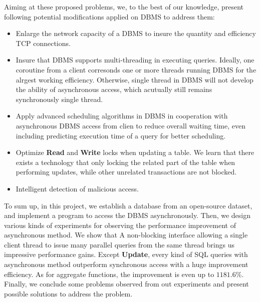 \documentclass[onecolumn, conference, 12pt]{IEEEtran}
\begin{document}
	Aiming at these proposed problems, we, to the best of our knowledge, present following potential modifications applied on DBMS to address them:
	\begin{itemize}
		\item Enlarge the network capacity of a DBMS to insure the quantity and efficiency TCP connections.
		\item Insure that DBMS supports multi-threading in executing queries. Ideally, one coroutine from a client corresonds one or more threads running DBMS for the alrgest working efficiency. Otherwise, single thread in DBMS will not develop the ability of asynchronous access, which acutually still remains synchronously single thread.
		\item Apply advanced scheduling algorithms in DBMS in cooperation with asynchronous DBMS access from clien to reduce overall waiting time, even including predicting execution time of a query for better scheduling.
		\item Optimize \textbf{Read} and \textbf{Write} locks when updating a table. We learn that there exists a technology that only locking the related part of the table when performing updates, while other unrelated transactions are not blocked.
		\item Intelligent detection of malicious access. 
	\end{itemize}
	
	To sum up, in this project, we establish a database from an open-source dataset, and implement a program to access the DBMS asynchronously. Then, we design various kinds of experiments for observing the performance improvement of asynchronous method. We show that A non-blocking interface allowing a single client thread to issue many parallel queries from the same thread brings us impressive performance gains. Except \textbf{Update}, every kind of SQL queries with asynchronous method outperform synchronous access with a huge improvement efficiency. As for aggregate functions, the improvement is even up to $ 1181.6\% $. Finally, we conclude some problems observed from out experiments and present possible solutions to address the problem.
	
	
	
\end{document}
